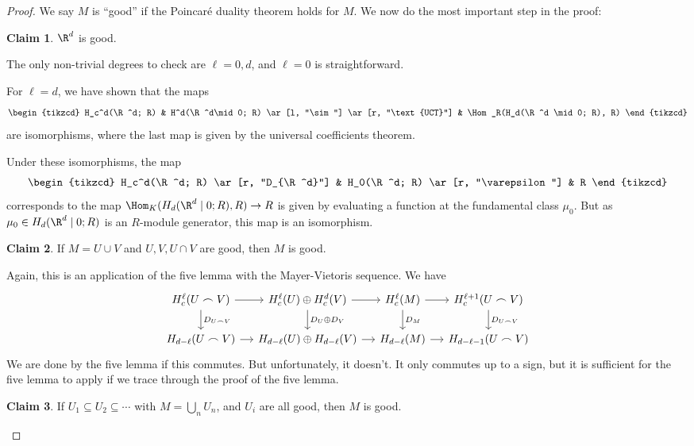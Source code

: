 \documentclass[a4paper]{article}
\theoremstyle{definition}
\newtheorem{cclaim}{Claim}
\begin{document}
\begin{proof}
  We say $M$ is ``good'' if the Poincar\'e duality theorem holds for $M$. We now do the most important step in the proof:
  \begin{cclaim}
    $\R^d$ is good.
  \end{cclaim}
  The only non-trivial degrees to check are $\ell = 0, d$, and $\ell = 0$ is straightforward.

  For $\ell =d $, we have shown that the maps
  \[
    \begin{tikzcd}
      H_c^d(\R^d; R) & H^d(\R^d\mid 0; R) \ar[l, "\sim"] \ar[r, "\text{UCT}"] & \Hom_R(H_d(\R^d \mid 0; R), R)
    \end{tikzcd}
  \]
  are isomorphisms, where the last map is given by the universal coefficients theorem.

  Under these isomorphisms, the map
  \[
    \begin{tikzcd}
      H_c^d(\R^d; R) \ar[r, "D_{\R^d}"] & H_0(\R^d; R) \ar[r, "\varepsilon"] & R
    \end{tikzcd}
  \]
  corresponds to the map $\Hom_K(H_d(\R^d \mid 0; R), R) \to R$ is given by evaluating a function at the fundamental class $\mu_0$. But as $\mu_0 \in H_d(\R^d \mid 0; R)$ is an $R$-module generator, this map is an isomorphism.

  \begin{cclaim}
    If $M = U \cup V$ and $U, V, U \cap V$ are good, then $M$ is good.
  \end{cclaim}
  Again, this is an application of the five lemma with the Mayer-Vietoris sequence. We have
  \[
    \begin{tikzcd}[column sep=small]
      H_c^\ell (U \frown V) \ar[r] \ar[d, "D_{U \frown V}"] & H_c^\ell(U) \oplus H_c^d(V) \ar[r] \ar[d, "D_U \oplus D_V"] & H_c^\ell(M) \ar[r] \ar[d, "D_M"] & H_c^{\ell + 1}(U \frown V) \ar[d, "D_{U\frown V}"]\\
      H_{d - \ell}(U \frown V) \ar[r] & H_{d - \ell}(U) \oplus H_{d - \ell}(V) \ar[r] & H_{d - \ell}(M) \ar[r] & H_{d - \ell - 1}(U \frown V)
    \end{tikzcd}
  \]
  We are done by the five lemma if this commutes. But unfortunately, it doesn't. It only commutes up to a sign, but it is sufficient for the five lemma to apply if we trace through the proof of the five lemma.

  \begin{cclaim}
    If $U_1 \subseteq U_2 \subseteq \cdots$ with $M = \bigcup_n U_n$, and $U_i$ are all good, then $M$ is good.
  \end{cclaim}


\end{proof}
\end{document}
